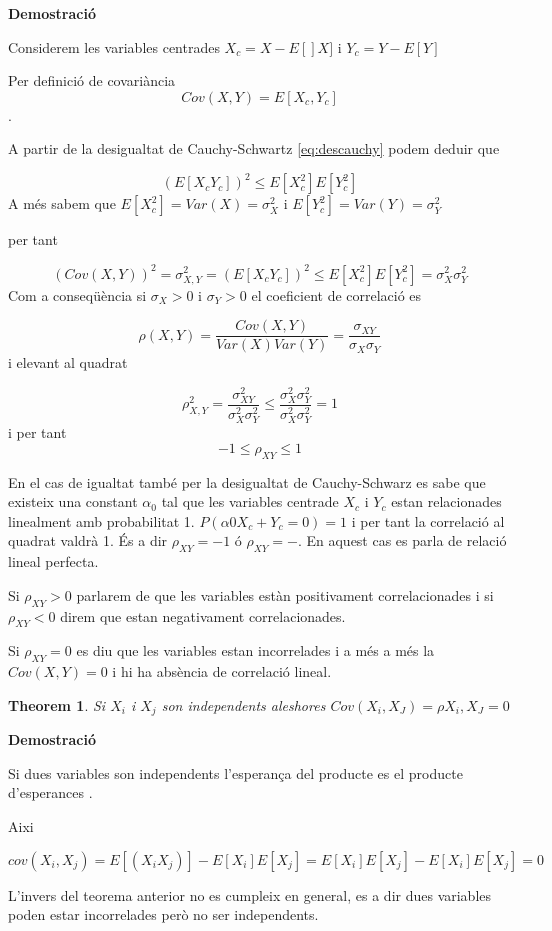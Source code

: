\documentclass[
  catalan,
]{article}
\newtheorem{theorem}{Theorem}[section]
\theoremstyle{definition}
\theoremstyle{definition}
\theoremstyle{definition}
\theoremstyle{definition}
\theoremstyle{remark}
\begin{document}
\textbf{Demostració}

Considerem les variables centrades \(X_c=X-E[]X]\) i \(Y_c=Y-E[Y]\)

Per definició de covariància
\[
Cov(X,Y)=E[X_c, Y_c]
\].

A partir de la desigualtat de Cauchy-Schwartz \eqref{eq:descauchy} podem deduir que

\[
(E[X_cY_c])^2\leq E[X_c^2] E[Y_c^2]
\]
A més sabem que \(E[X_c^2]=Var(X)=\sigma_X^2\) i \(E[Y_c^2]=Var(Y)=\sigma_Y^2\)

per tant

\[
(Cov(X,Y))^2 =\sigma_{X,Y}^2=(E[X_cY_c])^2\leq E[X_c^2] E[Y_c^2]=\sigma_X^2 \sigma_Y^2
\]
Com a conseqüència si \(\sigma_X>0\) i \(\sigma_Y>0\) el coeficient de correlació es

\[
\rho(X,Y)=\dfrac{Cov(X,Y)}{Var(X)Var(Y)}= \dfrac{\sigma_{XY}}{\sigma_X \sigma_Y}
\]
i elevant al quadrat

\[
\rho_{X,Y}^2= \dfrac {\sigma_{XY}^2} {\sigma_X^2 \sigma_Y^2} \leq  \dfrac {\sigma_X^2 \sigma_Y^2} {\sigma_X^2 \sigma_Y^2}=1
\]
i per tant
\[
-1 \leq \rho_{XY} \leq 1
\]

En el cas de igualtat també per la desigualtat de Cauchy-Schwarz es sabe que existeix una constant \(\alpha_0\) tal que les variables centrade \(X_c\) i \(Y_c\) estan relacionades linealment amb probabilitat 1. \(P(\alpha0 X_c+Y_c=0)=1\) i per tant la correlació al quadrat valdrà 1. És a dir \(\rho_{XY}=-1\) ó \(\rho_{XY}=-\). En aquest cas es parla de relació lineal perfecta.

Si \(\rho_{XY}>0\) parlarem de que les variables estàn positivament correlacionades i si \(\rho_{XY}<0\) direm que estan negativament correlacionades.

Si \(\rho_{XY}=0\) es diu que les variables estan incorrelades i a més a més la \(Cov(X,Y)=0\) i hi ha absència de correlació lineal.

\begin{theorem}
Si \(X_i\) i \(X_j\) son independents aleshores \(Cov(X_i,X_J)=\rho{X_i,X_J}=0\)
\end{theorem}

\textbf{Demostració}

Si dues variables son independents l'esperança del producte es el producte d'esperances .

Aixi

\[
cov(X_i,X_j)=E[(X_iX_j)]-E[X_i]E[X_j]=E[X_i]E[X_j]-E[X_i]E[X_j]=0 
\]

L'invers del teorema anterior no es cumpleix en general, es a dir dues variables poden estar incorrelades però no ser independents.
\end{document}
